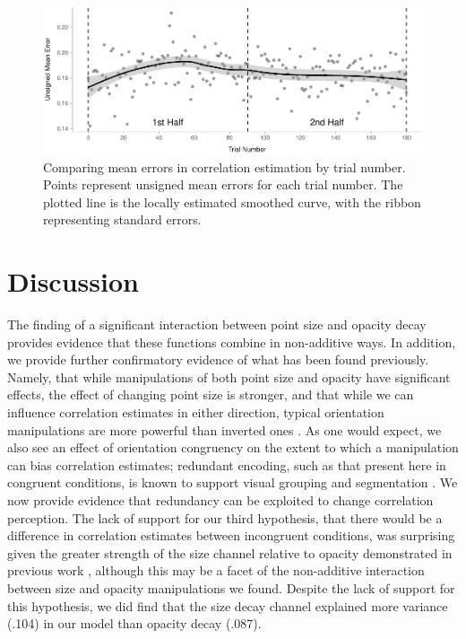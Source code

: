\documentclass[sigconf]{acmart}
\begin{document}
\begin{figure}

{\centering \includegraphics[width=1\textwidth,height=\textheight]{size_and_opacity_files/figure-pdf/fig-time-plot-1.pdf}

}

\caption{\label{fig-time-plot}Comparing mean errors in correlation
estimation by trial number. Points represent unsigned mean errors for
each trial number. The plotted line is the locally estimated smoothed
curve, with the ribbon representing standard errors.}

\end{figure}

\hypertarget{sec-discussion}{%
\section{Discussion}\label{sec-discussion}}

The finding of a significant interaction between point size and opacity
decay provides evidence that these functions combine in non-additive
ways. In addition, we provide further confirmatory evidence of what has
been found previously. Namely, that while manipulations of both point
size and opacity have significant effects, the effect of changing point
size is stronger, and that while we can influence correlation estimates
in either direction, typical orientation manipulations are more powerful
than inverted ones \citep{strain_2023, strain_2023b}. As one would
expect, we also see an effect of orientation congruency on the extent to
which a manipulation can bias correlation estimates; redundant encoding,
such as that present here in congruent conditions, is known to support
visual grouping and segmentation \citep{nothelfer_2017}. We now provide
evidence that redundancy can be exploited to change correlation
perception. The lack of support for our third hypothesis, that there
would be a difference in correlation estimates between incongruent
conditions, was surprising given the greater strength of the size
channel relative to opacity demonstrated in previous work
\citep{strain_2023, strain_2023b, hong_2021}, although this may be a
facet of the non-additive interaction between size and opacity
manipulations we found. Despite the lack of support for this hypothesis,
we did find that the size decay channel explained more variance (.104)
in our model than opacity decay (.087).
\end{document}
